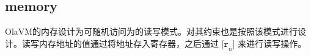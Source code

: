 \subsection{memory}\label{subsec: processor-memory}
OlaVM的内存设计为可随机访问为的读写模式。对其约束也是按照该模式进行设计。读写内存地址的值通过将地址存入寄存器，之后通过 $\texttt{[r}_n\texttt{]}$ 来进行读写操作。